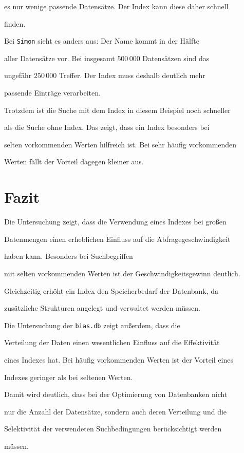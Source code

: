 \documentclass{article}
\begin{document}
es nur wenige passende Datensätze. Der Index kann diese daher schnell

finden.

Bei \texttt{Simon} sieht es anders aus: Der Name kommt in der Hälfte

aller Datensätze vor. Bei insgesamt $500\,000$ Datensätzen sind das

ungefähr $250\,000$ Treffer. Der Index muss deshalb deutlich mehr

passende Einträge verarbeiten.

Trotzdem ist die Suche mit dem Index in diesem Beispiel noch schneller

als die Suche ohne Index. Das zeigt, dass ein Index besonders bei

selten vorkommenden Werten hilfreich ist. Bei sehr häufig vorkommenden

Werten fällt der Vorteil dagegen kleiner aus.



\section{Fazit}

Die Untersuchung zeigt, dass die Verwendung eines Indexes bei großen

Datenmengen einen erheblichen Einfluss auf die Abfragegeschwindigkeit

haben kann. Besonders bei Suchbegriffen

mit selten vorkommenden Werten ist der Geschwindigkeitsgewinn deutlich.

Gleichzeitig erhöht ein Index den Speicherbedarf der Datenbank, da

zusätzliche Strukturen angelegt und verwaltet werden müssen.

Die Untersuchung der \texttt{bias.db} zeigt außerdem, dass die

Verteilung der Daten einen wesentlichen Einfluss auf die Effektivität

eines Indexes hat. Bei häufig vorkommenden Werten ist der Vorteil eines

Indexes geringer als bei seltenen Werten.

Damit wird deutlich, dass bei der Optimierung von Datenbanken nicht

nur die Anzahl der Datensätze, sondern auch deren Verteilung und die

Selektivität der verwendeten Suchbedingungen berücksichtigt werden

müssen.



\end{document}
